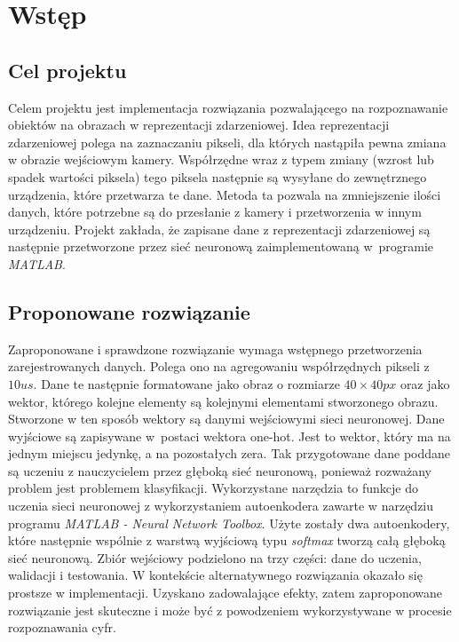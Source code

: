 \section{Wstęp}
\label{sec:wstep}

\subsection{Cel projektu}
\label{sub:celprojektu}

Celem projektu jest implementacja rozwiązania pozwalającego na rozpoznawanie obiektów na obrazach w reprezentacji zdarzeniowej. Idea reprezentacji zdarzeniowej polega na zaznaczaniu pikseli, dla których nastąpiła pewna zmiana w obrazie wejściowym kamery. Współrzędne wraz z typem zmiany (wzrost lub spadek wartości piksela) tego piksela następnie są wysyłane do zewnętrznego urządzenia, które przetwarza te dane. Metoda ta pozwala na zmniejszenie ilości danych, które potrzebne są do przesłanie z kamery i przetworzenia w innym urządzeniu. Projekt zakłada, że zapisane dane z reprezentacji zdarzeniowej są następnie przetworzone przez sieć neuronową zaimplementowaną w~programie \textit{MATLAB}.


\subsection{Proponowane rozwiązanie}
\label{sub:proponowanerozwiazanie}

Zaproponowane i sprawdzone rozwiązanie wymaga wstępnego przetworzenia zarejestrowanych danych. Polega ono na agregowaniu współrzędnych pikseli z \(10 \si{us}\). Dane te następnie formatowane jako obraz o rozmiarze \(40\times40\si{px}\) oraz jako wektor, którego kolejne elementy są kolejnymi elementami stworzonego obrazu. Stworzone w ten sposób wektory są danymi wejściowymi sieci neuronowej. Dane wyjściowe są zapisywane w~postaci wektora one-hot. Jest to wektor, który ma na jednym miejscu jedynkę, a na pozostałych zera. Tak przygotowane dane poddane są uczeniu z nauczycielem przez głęboką sieć neuronową, ponieważ rozważany problem jest problemem klasyfikacji. Wykorzystane narzędzia to funkcje do uczenia sieci neuronowej z wykorzystaniem autoenkodera zawarte w narzędziu programu \textit{MATLAB - Neural Network Toolbox}. Użyte zostały dwa autoenkodery, które następnie wspólnie z warstwą wyjściową typu \textit{softmax} tworzą całą głęboką sieć neuronową. Zbiór wejściowy podzielono na trzy części: dane do uczenia, walidacji i testowania. W kontekście alternatywnego rozwiązania okazało się prostsze w implementacji. Uzyskano zadowalające efekty, zatem zaproponowane rozwiązanie jest skuteczne i może być z powodzeniem wykorzystywane w procesie rozpoznawania cyfr.


